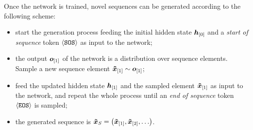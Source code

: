 Once the network is trained, novel sequences can be generated according to the following scheme:
\begin{itemize}
    \item start the generation process feeding the initial hidden state $\Elem{h}{0}$ and a \emph{start of sequence} token $\mathtt{\langle SOS \rangle}$ as input to the network;
    \item the output $\Elem{o}{1}$ of the network is a distribution over sequence elements. Sample a new sequence element $\Elem{\tilde{x}}{1} \sim \Elem{o}{1}$;
    \item feed the updated hidden state $\Elem{h}{1}$ and the sampled element $\Elem{\tilde{x}}{1}$ as input to the network, and repeat the whole process until an \emph{end of sequence} token $\mathtt{\langle EOS \rangle}$ is sampled;
    \item the generated sequence is $\Vector{\tilde{x}}_S = \Par{\Elem{\tilde{x}}{1}, \Elem{\tilde{x}}{2}, \ldots}$.
\end{itemize}

